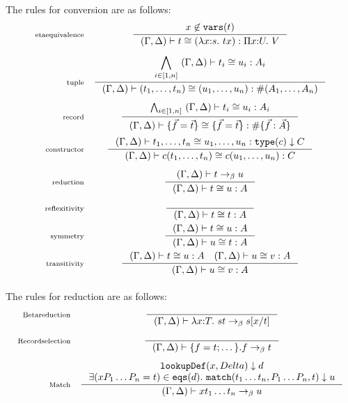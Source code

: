 \documentclass{article}
\newcommand{\fn}[1]{\mathtt{#1}}
\newcommand{\lamexpr}[3]{\lambda {#1}{:}{#2}.\ {#3}}
\newcommand{\Piexpr}[3]{\Pi {#1}{:}{#2}.\ {#3}}
\newcommand{\rlbl}[1]{\mathrm{\scriptstyle{}#1}}
\begin{document}
The rules for conversion are as follows:
\begin{gather*}
\begin{array}{rc}
\rlbl{eta equivalence}&
\inference{x \not\in \fn{vars}(t)}
          {\tcong{\defctx}{t}{(\lamexpr{x}{s}{t x})}{\Piexpr{x}{U}{V}}}\\[1.5em]
\rlbl{tuple}&
\inference{\displaystyle
           \bigwedge_{i\in[1,n]}\ \tcong{\defctx}{t_i}{u_i}{A_i}}
          {\tcong{\defctx}{  (t_1, \dots, t_n)}
                          {  (u_1, \dots, u_n)}
                          {\#(A_1, \dots, A_n)}}\\[1.5em]
\rlbl{record}&
\inference{\bigwedge_{i\in[1,n]}\ \tcong{\defctx}{t_i}{u_i}{A_i}}
          {\tcong{\defctx}{  \{ \vec{f} = \vec{t} \} }
                          {  \{ \vec{f} = \vec{t} \} }
                          {\#\{ \vec{f} : \vec{A} \} }}\\[1.5em]
\rlbl{constructor}&
\inference{\ccong{\defctx}{t_1,\dots,t_n}{u_1,\dots,u_n}{\fn{type}(c)}{C}}
          {\tcong{\defctx}{c(t_1, \dots, t_n)}{c(u_1, \dots, u_n)}{C}}\\[1.5em]
\rlbl{reduction}&
\inference{\defctx |- t \red{} u}
          {\tcong{\defctx}{t}{u}{A}}\\[1.5em]
\rlbl{reflexitivity}&
\inference{}{\tcong{\defctx}{t}{t}{A}}\\[1em]
\rlbl{symmetry}&
\inference{\tcong{\defctx}{t}{u}{A}}{\tcong{\defctx}{u}{t}{A}}\\[1em]
\rlbl{transitivity}&
\inference{\tcong{\defctx}{t}{u}{A}
     \quad \tcong{\defctx}{u}{v}{A}}
          {\tcong{\defctx}{u}{v}{A}}\\[1em]
\end{array}
\end{gather*}


\newcommand{\pmatch}[4]{\fn{match}(#1,#2,#3) \downarrow #4}

The rules for reduction are as follows:
\begin{gather*}
\begin{array}{rc}
\rlbl{Beta reduction} &
\inference{}{\defctx{} |- \lamexpr{x}{T}{s} t  \red{} s[x/t]}\\[1.5em]
\rlbl{Record selection} &
\inference{}{\defctx{} |- \{ f = t; \dots \}.f \red{} t}\\[1.5em]
\rlbl{Match} &
\inference{\fn{lookupDef}(x,Delta) \downarrow d\\
            \exists (x P_1 \dots P_n = t) \in \fn{eqs}(d).
              \ \pmatch{t_1 \dots t_n}{P_1 \dots P_n}{t}{u}}
          {\defctx{} |- x t_1 \dots t_n \red{} u}\\[1.5em]
\end{array}
\end{gather*}
\end{document}
